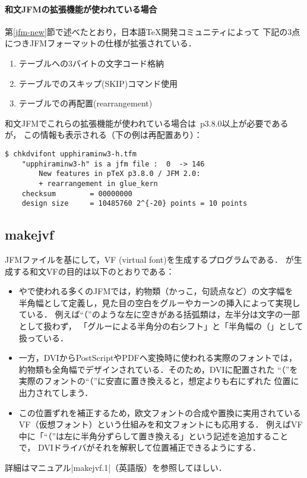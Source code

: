 \documentclass[a4paper,11pt,nomag]{jsarticle}
\begin{document}
\paragraph{和文JFMの拡張機能が使われている場合}
第\ref{jfm-new}節で述べたとおり，日本語\TeX 開発コミュニティによって
下記の3点につきJFMフォーマットの仕様が拡張されている．
\begin{enumerate}
  \item {}テーブルへの3バイトの文字コード格納
  \item {}テーブルでのスキップ(SKIP)コマンド使用
  \item {}テーブルでの再配置(rearrangement)
\end{enumerate}
和文JFMでこれらの拡張機能が使われている場合は\pTeX~p3.8.0以上が必要であるが，
この情報も表示される（下の例は再配置あり）：
\begin{verbatim}
$ chkdvifont upphiraminw3-h.tfm
    "upphiraminw3-h" is a jfm file :  0  -> 146
        New features in pTeX p3.8.0 / JFM 2.0:
        + rearrangement in glue_kern
    checksum        = 00000000
    design size     = 10485760 2^{-20} points = 10 points
\end{verbatim}

\subsection{makejvf}\label{makejvf}

JFMファイルを基にして，VF (virtual font)を生成するプログラムである．
が生成する和文VFの目的は以下のとおりである：
\begin{itemize}
  \item \pTeX や\upTeX で使われる多くのJFMでは，約物類（かっこ，句読点など）の文字幅を
    半角幅として定義し，見た目の空白をグルーやカーンの挿入によって実現している．
    例えば``（''のような左に空きがある括弧類は，左半分は文字の一部として扱わず，
    「グルーによる半角分の右シフト」と「半角幅の\inhibitglue （」として扱っている．
  \item 一方，DVIからPostScriptやPDFへ変換時に使われる実際のフォントでは，
    約物類も全角幅でデザインされている．そのため，DVIに配置された
    ``（''を実際のフォントの``（''に安直に置き換えると，想定よりも右にずれた
    位置に出力されてしまう．
  \item この位置ずれを補正するため，欧文フォントの合成や置換に実用されている
    VF（仮想フォント）という仕組みを和文フォントにも応用する．
    例えばVF中に「``（''は左に半角分ずらして置き換える」という記述を追加することで，
    DVIドライバがそれを解釈して位置補正できるようにする．
\end{itemize}
詳細はマニュアル|makejvf.1|（英語版）を参照してほしい．
\end{document}
